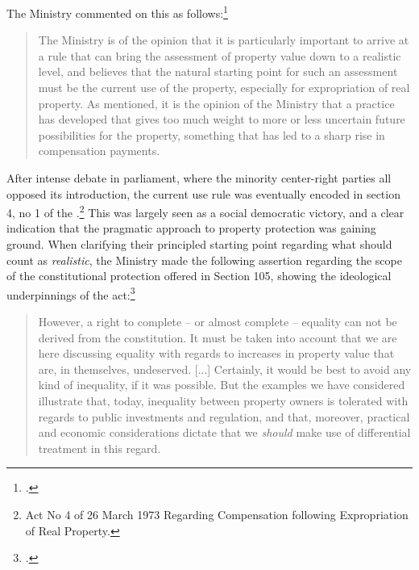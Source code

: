 The Ministry commented on this as follows:\footnote{\cite[19-20]{otprp59}.}

\begin{quote}
The Ministry is of the opinion that it is particularly important to arrive at a rule that can bring the assessment of property value down to a realistic level, and believes that the natural starting point for such an assessment must be the current use of the property, especially for expropriation of real property. As mentioned, it is the opinion of the Ministry that a practice has developed that gives too much weight to more or less uncertain future possibilities for the property, something that has led to a sharp rise in compensation payments.
\end{quote}

After intense debate in parliament, where the minority center-right parties all opposed its introduction, the current use rule was eventually encoded in section 4, no 1 of the \cite{ca73}.\footnote{Act No 4 of 26 March 1973 Regarding Compensation following Expropriation of Real Property.} This was largely seen as a social democratic victory, and a clear indication that the pragmatic approach to property protection was gaining ground. When clarifying their principled starting point regarding what should count as \emph{realistic}, the Ministry made the following assertion regarding the scope of the constitutional protection offered in Section 105, showing the ideological underpinnings of the act:\footcite[17]{otprp70}

\begin{quote}
However, a right to complete -- or almost complete -- equality can not be derived from the constitution. It must be taken into account that we are here discussing equality with regards to increases in property value that are, in themselves, undeserved. [...]  %
Certainly, it would be best to avoid any kind of inequality, if it was possible. But the examples we have considered illustrate that, today, inequality between property owners is tolerated with regards to public investments and regulation, and that, moreover, practical and economic considerations dictate that we \emph{should} make use of differential treatment in this regard.
\end{quote}

